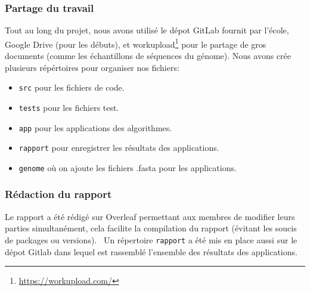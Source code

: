 \documentclass[12pt]{article}
\begin{document}
\subsubsection{Partage du travail}
Tout au long du projet, nous avons utilisé le dépot \textsf{GitLab} fournit par l'école, \textsf{Google Drive} (pour les débuts), et \textsf{workupload}\footnote{\url{https://workupload.com/}} pour le partage de gros documents (comme les échantillons de séquences du génome). Nous avons crée plusieurs répértoires pour organiser nos fichiers: 
\begin{itemize}
    \item \texttt{src} pour les fichiers de code.
    \item \texttt{tests} pour les fichiers test.
    \item \texttt{app} pour les applications des algorithmes.
    \item \texttt{rapport} pour enregistrer les résultats des applications.
    \item \texttt{genome} où on ajoute les fichiers .fasta pour les applications.
\end{itemize}

\subsubsection{Rédaction du rapport}
Le rapport a été rédigé sur \textsf{Overleaf} permettant aux membres de modifier leurs parties simultanément, cela facilite la compilation du rapport (évitant les soucis de packages ou versions). \ 
Un répertoire \texttt{rapport} a été mis en place aussi sur le dépot \textsf{Gitlab} dans lequel est rassemblé l'ensemble des résultats des applications.
\end{document}

